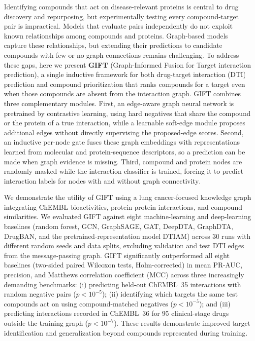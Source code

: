 Identifying compounds that act on disease-relevant proteins is central to drug discovery and repurposing, but experimentally testing every compound-target pair is impractical. Models that evaluate pairs independently do not exploit known relationships among compounds and proteins. Graph-based models capture these relationships, but extending their predictions to candidate compounds with few or no graph connections remains challenging.
To address these gaps, here we present \textbf{GIFT} (Graph-Informed Fusion for Target interaction prediction), a single inductive framework for both drug-target interaction (DTI) prediction and compound prioritization that ranks compounds for a target even when those compounds are absent from the interaction graph. GIFT combines three complementary modules. First, an edge-aware graph neural network is pretrained by contrastive learning, using hard negatives that share the compound or the protein of a true interaction, while a learnable soft-edge module proposes additional edges without directly supervising the proposed-edge scores. Second, an inductive per-node gate fuses these graph embeddings with representations learned from molecular and protein-sequence descriptors, so a prediction can be made when graph evidence is missing. Third, compound and protein nodes are randomly masked while the interaction classifier is trained, forcing it to predict interaction labels for nodes with and without graph connectivity.

We demonstrate the utility of GIFT using a lung cancer-focused knowledge graph integrating ChEMBL bioactivities, protein-protein interactions, and compound similarities. We evaluated GIFT against eight machine-learning and deep-learning baselines (random forest, GCN, GraphSAGE, GAT, DeepDTA, GraphDTA, DrugBAN, and the pretrained-representation model DTIAM) across 30 runs with different random seeds and data splits, excluding validation and test DTI edges from the message-passing graph. GIFT significantly outperformed all eight baselines (two-sided paired Wilcoxon tests, Holm-corrected) in mean PR-AUC, precision, and Matthews correlation coefficient (MCC) across three increasingly demanding benchmarks: (i) predicting held-out ChEMBL~35 interactions with random negative pairs ($p<10^{-5}$); (ii) identifying which targets the same test compounds act on using compound-matched negatives ($p<10^{-5}$); and (iii) predicting interactions recorded in ChEMBL~36 for 95 clinical-stage drugs outside the training graph ($p<10^{-7}$). These results demonstrate improved target identification and generalization beyond compounds represented during training.

